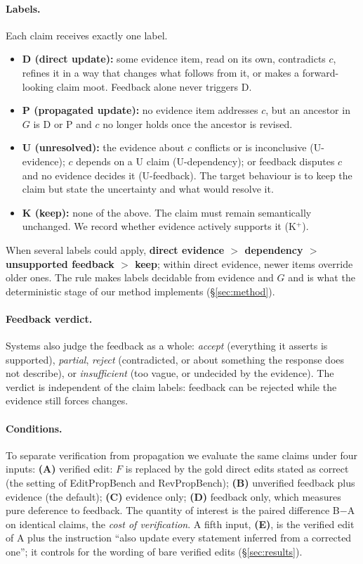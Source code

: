 \documentclass[11pt]{article}
\newcommand{\D}{\textsc{D}}
\newcommand{\Pp}{\textsc{P}}
\newcommand{\K}{\textsc{K}}
\newcommand{\U}{\textsc{U}}
\begin{document}
\paragraph{Labels.} Each claim receives exactly one label.
\begin{itemize}\itemsep0pt
  \item \textbf{\D{} (direct update):} some evidence item, read on its own, contradicts $c$, refines it in a way that changes what follows from it, or makes a forward-looking claim moot. Feedback alone never triggers \D{}.
  \item \textbf{\Pp{} (propagated update):} no evidence item addresses $c$, but an ancestor in $G$ is \D{} or \Pp{} and $c$ no longer holds once the ancestor is revised.
  \item \textbf{\U{} (unresolved):} the evidence about $c$ conflicts or is inconclusive (\U-evidence); $c$ depends on a \U{} claim (\U-dependency); or feedback disputes $c$ and no evidence decides it (\U-feedback). The target behaviour is to keep the claim but state the uncertainty and what would resolve it.
  \item \textbf{\K{} (keep):} none of the above. The claim must remain semantically unchanged. We record whether evidence actively supports it (\K$^{+}$).
\end{itemize}
When several labels could apply, \textbf{direct evidence $>$ dependency $>$ unsupported feedback $>$ keep}; within direct evidence, newer items override older ones. The rule makes labels decidable from evidence and $G$ and is what the deterministic stage of our method implements (\S\ref{sec:method}).

\paragraph{Feedback verdict.} Systems also judge the feedback as a whole: \emph{accept} (everything it asserts is supported), \emph{partial}, \emph{reject} (contradicted, or about something the response does not describe), or \emph{insufficient} (too vague, or undecided by the evidence). The verdict is independent of the claim labels: feedback can be rejected while the evidence still forces changes.

\paragraph{Conditions.} To separate verification from propagation we evaluate the same claims under four inputs: \textbf{(A)} verified edit: $F$ is replaced by the gold direct edits stated as correct (the setting of EditPropBench and RevPropBench); \textbf{(B)} unverified feedback plus evidence (the default); \textbf{(C)} evidence only; \textbf{(D)} feedback only, which measures pure deference to feedback. The quantity of interest is the paired difference B$-$A on identical claims, the \emph{cost of verification}. A fifth input, \textbf{(E)}, is the verified edit of A plus the instruction ``also update every statement inferred from a corrected one''; it controls for the wording of bare verified edits (\S\ref{sec:results}).
\end{document}
